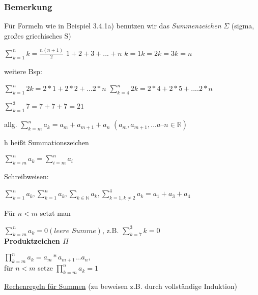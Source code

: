 \documentclass[a4paper, 12pt, twoside] {article}
\begin{document}
\subsubsection{Bemerkung}
Für Formeln wie in Beispiel 3.4.1a) benutzen wir das \textit{Summenzeichen} $\Sigma$ (sigma, großes griechisches S)

$\displaystyle\sum_{k = 1}^{n} k = \frac{n(n+1)}{2}$
$1 + 2 + 3 + ... +n$
$k = 1 k = 2 k = 3 k = n$ %

weitere Bsp:

$\sum_{k = 1}^{n} 2k = 2*1 + 2*2 + ... 2*n$
$\sum_{k=4}^{n} 2k = 2*4 + 2*5 + .... 2*n$

$\sum_{k=1}^{3} 7 = 7 + 7 + 7 = 21$ %

allg. $\sum_{k=m}^{n} a_k = a_m + a_{m+1} + a_n$
$(a_m, a_{m+1}, ... a–n \in \mathbb{R})$

h heißt Summationszeichen

$\sum_{k=m}^{n} a_k = \sum_{i = m}^{n} a_i$

Schreibweisen:

$\displaystyle\sum_{k = 1}^{n} a_k, \sum_{k = 1}^{n} a_k, \sum_{k \in \mathbb{N}} a_k, \sum_{k=1, k \neq 2}^{4} a_k = a_1 + a_3 + a_4$

Für $n < m$ setzt man

$\sum_{k=m}^{n} a_k = 0 (\textit{leere Summe})$, z.B. $\sum_{k=7}^{3} k = 0$ \\


\textbf{Produktzeichen $\Pi$}

$\displaystyle\prod_{k=m}^{n} a_k = a_m * a_{m+1} ... a_n,$ \\
für $n < m$ setze $\displaystyle\prod_{k=m}^{n} a_k = 1$

\underline{Rechenregeln für Summen} (zu beweisen z.B. durch vollständige Induktion)
\end{document}
